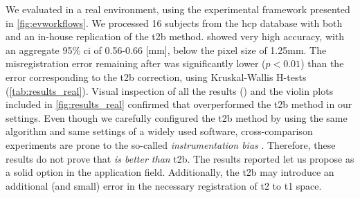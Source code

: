 We evaluated \regseg{} in a real environment, using the experimental framework presented
  in \autoref{fig:evworkflows}.
We processed 16 subjects from the \gls*{hcp} database with both \regseg{}
  and an in-house replication of the \acrfull*{t2b} method.
\Regseg{} showed very high accuracy, with an aggregate 95\% \gls*{ci} of 0.56-0.66 [mm],
  below the pixel size of 1.25mm.
The misregistration error remaining after \regseg{} was significantly lower ($p < 0.01$) than the
  error corresponding to the \gls*{t2b} correction, using Kruskal-Wallis H-tests
  (\autoref{tab:results_real}).
Visual inspection of all the results () and the violin plots included in
  \autoref{fig:results_real} confirmed that \regseg{} overperformed the \gls*{t2b} method
  in our settings.
Even though we carefully configured the \gls*{t2b} method by using the same algorithm and
  same settings of a widely used software, cross-comparison experiments are prone to
  the so-called \emph{instrumentation bias} \citep{tustison_instrumentation_2013}.
Therefore, these results do not prove that \regseg{} \emph{is better than} \gls*{t2b}.
The results reported let us propose \regseg{} as a solid option in the application field.
Additionally, the \gls*{t2b} may introduce an additional (and small) error in the necessary
  registration of \gls*{t2} to \gls*{t1} space.


